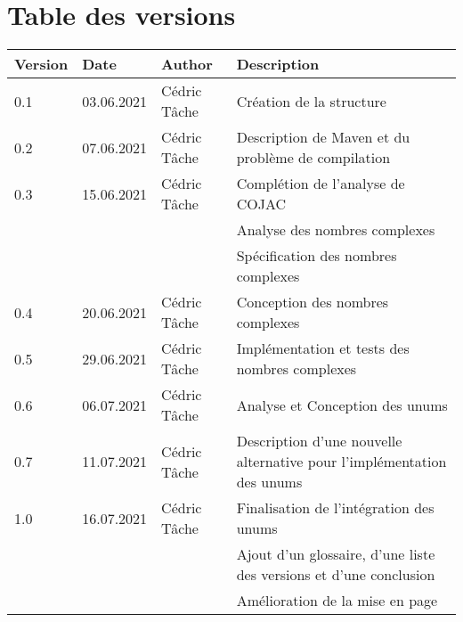 \documentclass[french,11pt]{report}
\begin{document}




\pagestyle{toc}
\section *{Table des versions}
\vspace*{0.5 cm}

\begin{table}[h]
    \begin{tabularx}{\columnwidth}{ | p{3.5em} |p{7em} | p{6.5em} | X |}
        \hline
        \textbf{Version} & \textbf{Date} & \textbf{Author} & \textbf{Description} \\
        \hline
        0.1 & 03.06.2021 & Cédric Tâche & Création de la structure \\
        0.2 & 07.06.2021 & Cédric Tâche & Description de Maven et du problème de compilation \\
        0.3 & 15.06.2021 & Cédric Tâche & Complétion de l'analyse de COJAC \\
         & & & Analyse des nombres complexes \\
         & & & Spécification des nombres complexes \\
        0.4 & 20.06.2021 & Cédric Tâche & Conception des nombres complexes \\
        0.5 & 29.06.2021 & Cédric Tâche & Implémentation et tests des nombres complexes \\
        0.6 & 06.07.2021 & Cédric Tâche & Analyse et Conception des unums \\
        0.7 & 11.07.2021 & Cédric Tâche & Description d'une nouvelle alternative pour l'implémentation des unums \\
        1.0 & 16.07.2021 & Cédric Tâche & Finalisation de l'intégration des unums \\
         & & & Ajout d'un glossaire, d'une liste des versions et d'une conclusion \\
         & & & Amélioration de la mise en page \\
        \hline
    \end{tabularx}
\end{table}

\newpage


\hypersetup{
	hidelinks,
	allcolors=black,
	linktocpage,
	linktoc=all
}
\tableofcontents
\newpage



\pagestyle{content}


\end{document}
